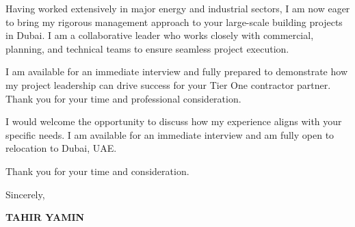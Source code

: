 \documentclass[11pt,a4paper]{article}
\begin{document}
Having worked extensively in major energy and industrial sectors, I am now eager to bring my rigorous management approach to your large-scale building projects in Dubai. I am a collaborative leader who works closely with commercial, planning, and technical teams to ensure seamless project execution.

I am available for an immediate interview and fully prepared to demonstrate how my project leadership can drive success for your Tier One contractor partner. Thank you for your time and professional consideration.

I would welcome the opportunity to discuss how my experience aligns with your specific needs. I am available for an immediate interview and am fully open to relocation to Dubai, UAE.

Thank you for your time and consideration.

\vspace{0.5cm}
Sincerely,

\vspace{0.5cm}
\textbf{TAHIR YAMIN}
\end{document}

